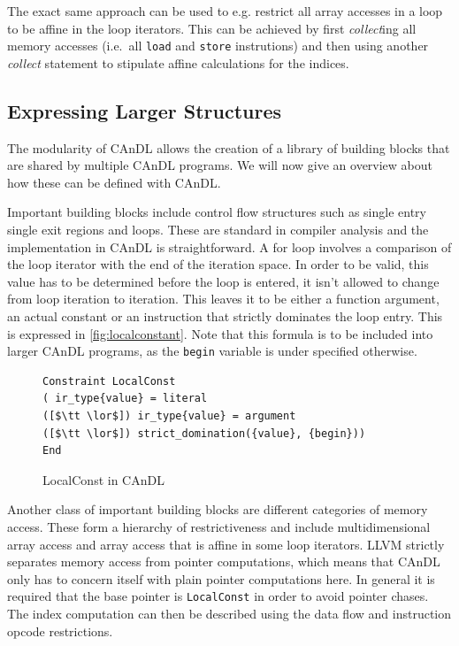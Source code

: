     The exact same approach can be used to e.g. restrict all array accesses in a
    loop to be affine in the loop iterators.
    This can be achieved by first {\it collect}ing all memory accesses
    (i.e.\ all \texttt{load} and \texttt{store} instrutions) and then using
    another {\it collect} statement to stipulate affine calculations for the
    indices.

\subsection{Expressing Larger Structures}

    The modularity of CAnDL allows the creation of a library of building blocks
    that are shared by multiple CAnDL programs.
    We will now give an overview about how these can be defined with CAnDL.

    Important building blocks include control flow structures such as single
    entry single exit regions and loops.
    These are standard in compiler analysis and the implementation in CAnDL is
    straightforward.
    A for loop involves a comparison of the loop iterator with the end of the
    iteration space.
    In order to be valid, this value has to be determined before the loop is
    entered, it isn't allowed to change from loop iteration to iteration.
    This leaves it to be either a function argument, an actual constant or an
    instruction that strictly dominates the loop entry.
    This is expressed in \autoref{fig:localconstant}.
    Note that this formula is to be included into larger CAnDL programs, as the
    \texttt{begin} variable is under specified otherwise.

\begin{figure}[ht]
\begin{lstlisting}[language=CAnDL]
Constraint LocalConst
( ir_type{value} = literal
([$\tt \lor$]) ir_type{value} = argument
([$\tt \lor$]) strict_domination({value}, {begin}))
End
\end{lstlisting}
\vspace{-0.3cm}
\caption{LocalConst in CAnDL}
\label{fig:localconstant}
\end{figure}

    Another class of important building blocks are different categories of
    memory access.
    These form a hierarchy of restrictiveness and include multidimensional array
    access and array access that is affine in some loop iterators.
    LLVM strictly separates memory access from pointer computations, which means
    that CAnDL only has to concern itself with plain pointer computations here.
    In general it is required that the base pointer is \texttt{LocalConst} in
    order to avoid pointer chases.
    The index computation can then be described using the data flow and
    instruction opcode restrictions.

